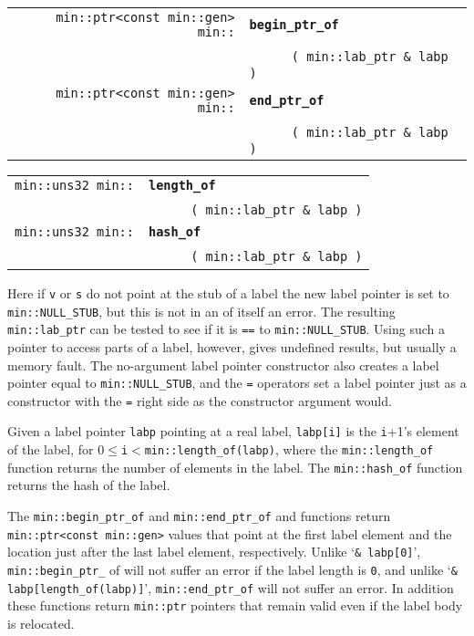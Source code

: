 \documentclass[12pt]{article}
\makeatletter
\newcommand{\ttindex}[1]{\index{#1@{\tt #1}}}
\newcommand{\minindex}[1]{\ttindex{min::#1}\ttindex{#1}}
\newcommand{\EOL}{\penalty \exhyphenpenalty}
\newenvironment{indpar}[1][0.3in]%
	{\begin{list}{}%
		     {\setlength{\itemsep}{0in}%
		      \setlength{\topsep}{0in}%
		      \setlength{\parsep}{1ex}%
		      \setlength{\labelwidth}{#1}%
		      \setlength{\leftmargin}{#1}%
		      \addtolength{\leftmargin}{\labelsep}}%
	 \item}%
	{\end{list}}
\newcommand{\LABEL}[1]{\label{#1}}
\newcommand{\ARGBREAK}{\\&{\tt ~~~~}}
\newcommand{\MINKEY}[1]{{\tt \bf #1}\minindex{#1}}
\makeatother
\begin{document}
\begin{indpar}\begin{tabular}{r@{}l}
\verb|min::ptr<const min::gen> min::|
	& \MINKEY{begin\_ptr\_of}\ARGBREAK
	  \verb| ( min::lab_ptr & labp )|
\LABEL{MIN::BEGIN_PTR_OF_LAB_PTR} \\
\verb|min::ptr<const min::gen> min::|
	& \MINKEY{end\_ptr\_of}\ARGBREAK
	  \verb| ( min::lab_ptr & labp )|
\LABEL{MIN::END_PTR_OF_LAB_PTR} \\
\end{tabular}\end{indpar}

\begin{indpar}\begin{tabular}{r@{}l}
\verb|min::uns32 min::|
	& \MINKEY{length\_of}\ARGBREAK
	  \verb| ( min::lab_ptr & labp )|
\LABEL{MIN::LENGTH_OF_LAB_PTR} \\
\verb|min::uns32 min::|
	& \MINKEY{hash\_of}\ARGBREAK
	  \verb| ( min::lab_ptr & labp )|
\LABEL{MIN::HASH_OF_LAB_PTR} \\
\end{tabular}\end{indpar}

Here if \verb|v| or \verb|s| do not point at the stub of a label
the new label pointer is set to {\tt min::\EOL NULL\_\EOL STUB},
but this is not in an of itself an error.  The resulting
{\tt min::\EOL lab\_\EOL ptr} can be tested to see if it is {\tt ==}
to {\tt min::\EOL NULL\_\EOL STUB}.  Using such a pointer to access
parts of a label, however, gives undefined results,
but usually a memory fault.
The no-argument label
pointer constructor also creates a label pointer equal to
{\tt min::\EOL NULL\_\EOL STUB}, and the {\tt =} operators
set a label pointer just as a constructor with the {\tt =} right side
as the constructor argument would.

Given a label pointer \verb|labp| pointing at a real label,
\verb|labp[i]| is the \verb|i|+1's
element of the label, for
$0\leq$\verb|i|$<$\verb|min::length_of(labp)|,
where the {\tt min::\EOL length\_\EOL of} function
returns the number of elements in the label.
The {\tt min::\EOL hash\_\EOL of} function returns the hash of the label.

The {\tt min::\EOL begin\_\EOL ptr\_\EOL of} and
{\tt min::\EOL end\_\EOL ptr\_\EOL of} and
functions return {\tt min::\EOL ptr<const min::\EOL gen>} values that
point at the first label element and the location just after the
last label element, respectively.  Unlike `{\tt \& labp[0]}',
{\tt min::\EOL begin\_\EOL ptr\_\EOL} of will not suffer an error if
the label length is {\tt 0}, and unlike
`{\tt \& labp[length\_of(labp)]}',
{\tt min::\EOL end\_\EOL ptr\_\EOL of} will not suffer an error.
In addition these functions return {\tt min::ptr} pointers that
remain valid even if the label body is relocated.
\end{document}
